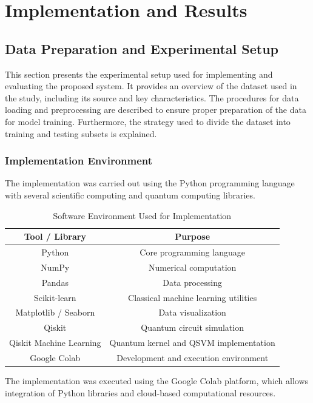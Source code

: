 \chapter{Implementation and Results}

\section{Data Preparation and Experimental Setup}

This section presents the experimental setup used for implementing and evaluating the proposed system. It provides an overview of the dataset used in the study, including its source and key characteristics. The procedures for data loading and preprocessing are described to ensure proper preparation of the data for model training. Furthermore, the strategy used to divide the dataset into training and testing subsets is explained. 

\subsection{Implementation Environment}

The implementation was carried out using the Python programming language with several scientific computing and quantum computing libraries.

\begin{table}[h]
\centering
\caption{Software Environment Used for Implementation}
\begin{tabular}{|c|c|}
\hline
Tool / Library & Purpose \\
\hline
Python & Core programming language \\
NumPy & Numerical computation \\
Pandas & Data processing \\
Scikit-learn & Classical machine learning utilities \\
Matplotlib / Seaborn & Data visualization \\
Qiskit & Quantum circuit simulation \\
Qiskit Machine Learning & Quantum kernel and QSVM implementation \\
Google Colab & Development and execution environment \\
\hline
\end{tabular}
\end{table}

The implementation was executed using the Google Colab platform, which allows integration of Python libraries and cloud-based computational resources.

